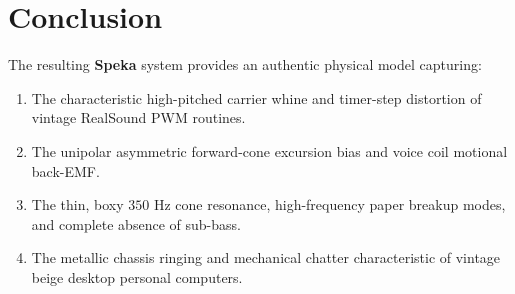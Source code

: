\documentclass[11pt,a4paper]{article}
\begin{document}
\section{Conclusion}
The resulting \textbf{Speka} system provides an authentic physical model capturing:
\begin{enumerate}
    \item The characteristic high-pitched carrier whine and timer-step distortion of vintage RealSound PWM routines.
    \item The unipolar asymmetric forward-cone excursion bias and voice coil motional back-EMF.
    \item The thin, boxy $350\text{ Hz}$ cone resonance, high-frequency paper breakup modes, and complete absence of sub-bass.
    \item The metallic chassis ringing and mechanical chatter characteristic of vintage beige desktop personal computers.
\end{enumerate}
\end{document}
